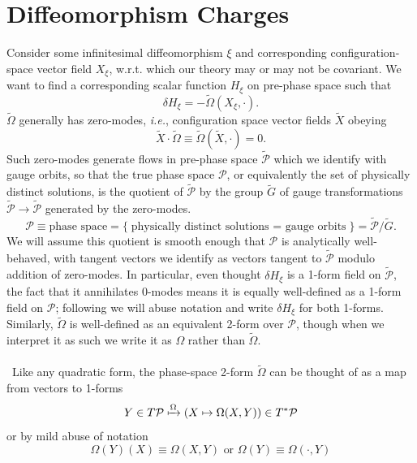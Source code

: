 \documentclass[11pt,letterpaper]{article}
\newcommand{\LP}{\left(}
\newcommand{\RP}{\right)}
\newcommand{\mc}[1]{\mathcal{#1}}
\begin{document}
\section{Diffeomorphism Charges}
Consider some infinitesimal diffeomorphism $\xi$ and corresponding configuration-space vector field $X_\xi$, w.r.t. which our theory may or may not be covariant. We want to find a corresponding scalar function $H_\xi$ on pre-phase space such that \begin{equation}
\delta H_\xi = - \tilde{\Omega}(X_\xi, \cdot).
\end{equation}
$\tilde{\Omega}$ generally has zero-modes, \textit{i.e.}, configuration space vector fields $\tilde{X}$ obeying \begin{equation}
\tilde{X} \cdot \tilde{\Omega} \equiv \tilde{\Omega}(\tilde{X}, \cdot) = 0.
\end{equation}
Such zero-modes generate flows in pre-phase space $\tilde{\mc{P}}$ which we identify with gauge orbits, so that the true phase space $\mc{P}$, or equivalently the set of physically distinct solutions, is the quotient of $\tilde{\mc{P}}$ by the group $\tilde{G}$ of gauge transformations $\tilde{\mc{P}} \to \tilde{\mc{P}}$ generated by the zero-modes. \begin{equation}
\mc{P} \equiv \mbox{phase space} = \{ \mbox{physically distinct solutions $=$ gauge orbits} \} = \tilde{\mc{P}} / \tilde{G}.
\end{equation}
We will assume this quotient is smooth enough that $\mc{P}$ is analytically well-behaved, with tangent vectors we identify as vectors tangent to $\tilde{\mc{P}}$ modulo addition of zero-modes. In particular, even thought $\delta H_\xi$ is a 1-form field on $\tilde{\mc{P}}$, the fact that it annihilates 0-modes means it is equally well-defined as a 1-form field on $\mc{P}$; following \cite{Harlow:2019yfa} we will abuse notation and write $\delta H_\xi$ for both 1-forms. Similarly, $\tilde{\Omega}$ is well-defined as an equivalent 2-form over $\mc{P}$, though when we interpret it as such we write it as $\Omega$ rather than $\tilde{\Omega}$. \\
\\
\
Like any quadratic form, the phase-space 2-form $\tilde{\Omega}$ can be thought of as a map from vectors to 1-forms \begin{equation}
Y \in T \mc{P} \xmapsto{\Omega} \LP X \mapsto \Omega(X,Y) \RP \in T^* \mc{P}
\end{equation}
or by mild abuse of notation \begin{equation}
\Omega(Y)(X) \equiv \Omega(X,Y) \mbox{ or } \Omega(Y) \equiv \Omega( \cdot, Y)
\end{equation}
\end{document}
